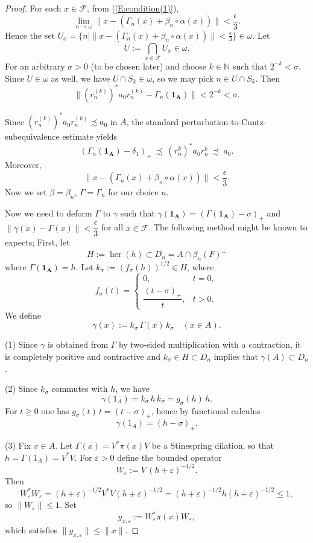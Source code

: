 \documentclass[12pt]{amsart}
\theoremstyle{plain}
\theoremstyle{definition}
\def\her{\operatorname{her}}
\newcommand{\mc}{\mathcal}
\numberwithin{equation}{section}
\begin{document}
\begin{proof}
\noindent
For each $x \in \mc{F}$, from (\ref{E:condition(1)}), 
\[ \lim_{n\to \omega} \| x -(\Gamma_n(x)+ \beta_n \circ \alpha (x) )  \| < \frac{\epsilon}{3}. \]
Hence the set $U_x=\{n \mid \| x -(\Gamma_n(x)+ \beta_n \circ \alpha (x) )  \| < \frac{\epsilon}{3} \} \in \omega$. 
 Let
\[
U:=\bigcap_{x\in\mc{F}} U_x \in\omega.
\]
\noindent
For an arbitrary $\sigma >0$ (to be chosen later) and choose $k\in\mathbb N$ such that $2^{-k}<\sigma$. Since $U\in\omega$ as well, we have $U\cap S_k\in\omega$,
so we may pick $n\in U\cap S_k$. Then
\[
\|(r^{(k)}_{n})^*a_0 r^{(k)}_{n}-\Gamma_{n}(\mathbf{1_A})\|<2^{-k}<\sigma.
\]

Since $(r^{(k)}_{n})^*a_0 r^{(k)}_{n}\precsim a_0$ in $A$, the standard
perturbation-to-Cuntz-sub\-equivalence estimate yields
\[
(\Gamma_{n}(\mathbf{1_A})-\delta_1)_+\ \precsim\ (r^k_{n})^*a_0 r^k_{n}
\ \precsim\ a_0.
\]
Moreover, 
\begin{equation}\label{E:normestimate}
\| x -(\Gamma_{n}(x)+ \beta_{n} \circ \alpha (x) )  \| < \frac{\epsilon}{3}. 
\end{equation}
Now we set $\beta=\beta_n$, $\Gamma=\Gamma_n$ for our choice $n$. 

Now we need to deform $\Gamma$ to $\gamma$ such that $\gamma(\mathbf{1_A})= (\Gamma(\mathbf{1_A})-\sigma)_{+}$ and $\| \gamma(x) -\Gamma(x)\| < \dfrac{\epsilon}{3}$ for all $x \in \mc{F}$.  The following method might be known to expects;   
 First,  let 
\[H:=\her(h) \subset D_n=A\cap \beta_n(F)^{\perp} \] where $\Gamma(\mathbf{1_A})=h$.  Let $k_\sigma:=(f_\sigma(h))^{1/2} \in H$, where
\[
f_\sigma(t)=
\begin{cases}
0,& t=0,\\
\dfrac{(t-\sigma)_+}{t},& t > 0.
\end{cases}
\]
We define
\[
 \gamma(x):=k_{\sigma}\,\Gamma(x)\,k_{\sigma} \quad (x\in A).
\]

(1) Since $\gamma$ is obtained from $\Gamma$ by two-sided multiplication with a contraction,
it is completely positive and contractive and $k_{\sigma} \in H \subset D_n$ implies that $\gamma(A) \subset D_n$. 

\smallskip
(2) Since $k_\sigma$ commutes with $h$, we have
\[
\gamma(1_A)=k_\sigma\,h\,k_\sigma=g_\sigma(h)\,h.
\]
For  $t\ge 0$ one has $g_\sigma(t)\,t=(t-\sigma)_+$, hence by functional calculus
\[
\gamma(1_A)=(h-\sigma)_+.
\]

\smallskip
(3) Fix $x\in A$.
Let $\Gamma(x)=V^*\pi(x)V$ be a Stinespring dilation, so that $h=\Gamma(1_A)=V^*V$.
For $\varepsilon>0$ define the bounded operator
\[
W_\varepsilon:=V\,(h+\varepsilon)^{-1/2}.
\]
Then
\[
W_\varepsilon^*W_\varepsilon
=(h+\varepsilon)^{-1/2}V^*V(h+\varepsilon)^{-1/2}
=(h+\varepsilon)^{-1/2}h(h+\varepsilon)^{-1/2}
\le 1,
\]
so $\|W_\varepsilon\|\le 1$.
Set
\[
y_{x,\varepsilon}:=W_\varepsilon^*\pi(x)W_\varepsilon,
\]
which satisfies $\|y_{x,\varepsilon}\|\le \|x\|$.


\end{proof}
\end{document}
